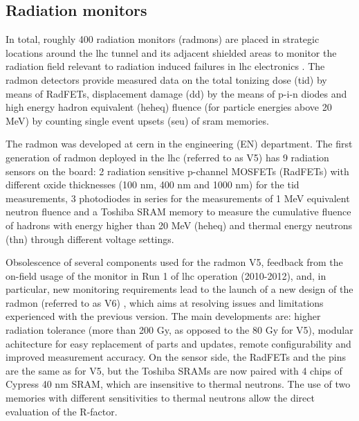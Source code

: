 \documentclass[encoding=utf8,british]{tumphthesis}
\begin{document}
\subsection{Radiation monitors}
\label{section:radmon-description}

In total, roughly 400 radiation monitors (\acrshort{radmon}s) \cite{description:RadMON} are placed in strategic locations around the \acrshort{lhc} tunnel and its adjacent shielded areas to monitor the radiation field relevant to radiation induced failures in \acrshort{lhc} electronics \cite{Spiezia:2011jp}. The \acrshort{radmon} detectors provide measured data on the total tonizing dose (\acrshort{tid}) by means of RadFETs, displacement damage (\acrshort{dd}) by the means of p-i-n diodes and high energy hadron equivalent (\acrshort{heheq}) fluence (for particle energies above 20 MeV) by counting single event upsets (\acrshort{seu}) of \acrshort{sram} memories. 

The \acrshort{radmon} was developed at \acrshort{cern} in the engineering (EN) department. The first generation of \acrshort{radmon} deployed in the \acrshort{lhc} (referred to as V5) has 9 radiation sensors on the board: 2 radiation sensitive p-channel MOSFETs (RadFETs) with different oxide thicknesses (100 nm, 400 nm and 1000 nm) for the \acrshort{tid} measurements, 3 photodiodes in series for the measurements of 1 MeV equivalent neutron fluence and a Toshiba SRAM memory to measure the cumulative fluence of hadrons with energy higher than 20 MeV (\acrshort{heheq}) and thermal energy neutrons (\acrshort{thn}) through different voltage settings. \cite{Spiezia:2011jp}


Obsolescence of several components used for the \acrshort{radmon} V5, feedback from the on-field usage of the monitor in Run 1 of \acrshort{lhc} operation (2010-2012), and, in particular, new monitoring requirements lead to the launch of a new design of the \acrshort{radmon} (referred to as V6) \cite{description:RadMON}, which aims at resolving issues and limitations experienced with the previous version. The main developments are: higher radiation tolerance (more than 200 Gy, as opposed to the 80 Gy for V5), modular achitecture for easy replacement of parts and updates, remote configurability and improved measurement accuracy. On  the sensor side, the  RadFETs and the pins are the same as for V5, but the Toshiba SRAMs are now paired with 4 chips of Cypress 40 nm SRAM, which are insensitive to thermal neutrons. The use of two memories with different sensitivities to thermal neutrons allow the direct evaluation of the R-factor.
\end{document}
